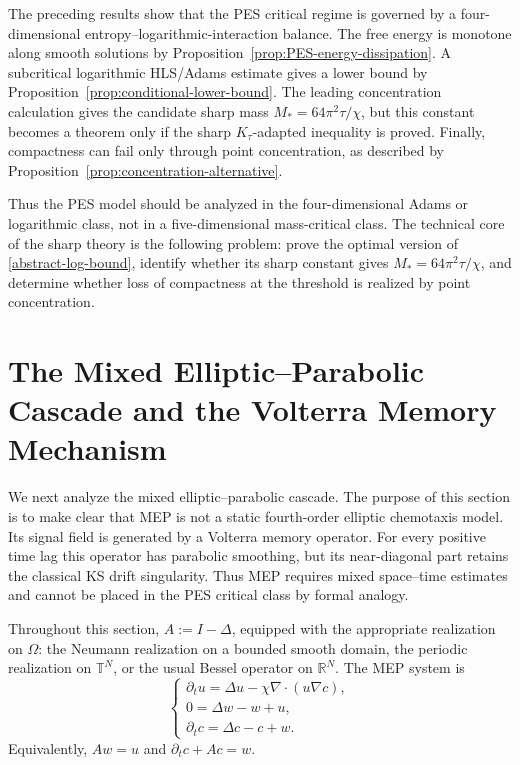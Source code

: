 \documentclass[pdflatex,sn-mathphys-num]{sn-jnl}%
\theoremstyle{thmstyleone}
\theoremstyle{thmstyletwo}
\theoremstyle{thmstylethree}
\begin{document}
The preceding results show that the PES critical regime is governed by a
four-dimensional entropy--logarithmic-interaction balance.  The free energy is
monotone along smooth solutions by Proposition~\ref{prop:PES-energy-dissipation}.
A subcritical logarithmic HLS/Adams estimate gives a lower bound by
Proposition~\ref{prop:conditional-lower-bound}.  The leading concentration
calculation gives the candidate sharp mass \(M_*=64\pi^2\tau/\chi\), but this
constant becomes a theorem only if the sharp \(K_\tau\)-adapted inequality is
proved.  Finally, compactness can fail only through point concentration, as
described by Proposition~\ref{prop:concentration-alternative}.

Thus the PES model should be analyzed in the four-dimensional Adams or logarithmic
class, not in a five-dimensional mass-critical class.  The technical core of
the sharp theory is the following problem: prove the optimal version of
\eqref{abstract-log-bound}, identify whether its sharp constant gives
\(M_*=64\pi^2\tau/\chi\), and determine whether loss of compactness at the
threshold is realized by point concentration.




\section{The Mixed Elliptic--Parabolic Cascade and the Volterra Memory Mechanism}
\label{sec:MEP-volterra}

We next analyze the mixed elliptic--parabolic cascade.  The purpose of this
section is to make clear that MEP is not a static fourth-order elliptic
chemotaxis model.  Its signal field is generated by a Volterra memory
operator.  For every positive time lag this operator has parabolic smoothing,
but its near-diagonal part retains the classical KS drift
singularity.  Thus MEP requires mixed space--time estimates and cannot be
placed in the PES critical class by formal analogy.

Throughout this section, \(A:=I-\Delta\), equipped with the appropriate
realization on \(\Omega\): the Neumann realization on a bounded smooth domain,
the periodic realization on \(\mathbb T^N\), or the usual Bessel operator on
\(\mathbb R^N\).  The MEP system is
\[
\begin{cases}
    \partial_tu=\Delta u-\chi\nabla\cdot(u\nabla c),\\
    0=\Delta w-w+u,\\
    \partial_tc=\Delta c-c+w.
\end{cases}
\tag{MEP}
\label{MEP-section4}
\]
Equivalently, \(Aw=u\) and \(\partial_tc+Ac=w\).
\end{document}
